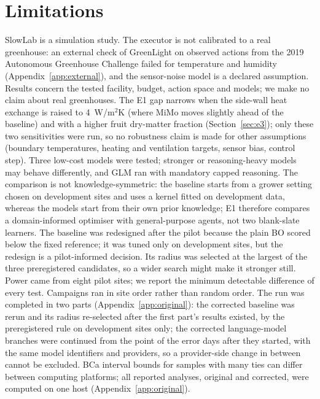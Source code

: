 \section{Limitations}
SlowLab is a simulation study. The executor is not calibrated to a real greenhouse: an external check of GreenLight on observed actions from the 2019 Autonomous Greenhouse Challenge failed for temperature and humidity (Appendix~\ref{app:external}), and the sensor-noise model is a declared assumption. Results concern the tested facility, budget, action space and models; we make no claim about real greenhouses. The E1 gap narrows when the side-wall heat exchange is raised to 4~W/m$^2$K (where MiMo moves slightly ahead of the baseline) and with a higher fruit dry-matter fraction (Section~\ref{sec:e3}); only these two sensitivities were run, so no robustness claim is made for other assumptions (boundary temperatures, heating and ventilation targets, sensor bias, control step). Three low-cost models were tested; stronger or reasoning-heavy models may behave differently, and GLM ran with mandatory capped reasoning. The comparison is not knowledge-symmetric: the baseline starts from a grower setting chosen on development sites and uses a kernel fitted on development data, whereas the models start from their own prior knowledge; E1 therefore compares a domain-informed optimiser with general-purpose agents, not two blank-slate learners. The baseline was redesigned after the pilot because the plain BO scored below the fixed reference; it was tuned only on development sites, but the redesign is a pilot-informed decision. Its radius was selected at the largest of the three preregistered candidates, so a wider search might make it stronger still. Power came from eight pilot sites; we report the minimum detectable difference of every test. Campaigns ran in site order rather than random order. The run was completed in two parts (Appendix~\ref{app:original}): the corrected baseline was rerun and its radius re-selected after the first part's results existed, by the preregistered rule on development sites only; the  corrected language-model branches were continued from the point of the error days after they started, with the same model identifiers and providers, so a provider-side change in between cannot be excluded. BCa interval bounds for samples with many ties can differ between computing platforms; all reported analyses, original and corrected, were computed on one host (Appendix~\ref{app:original}).
